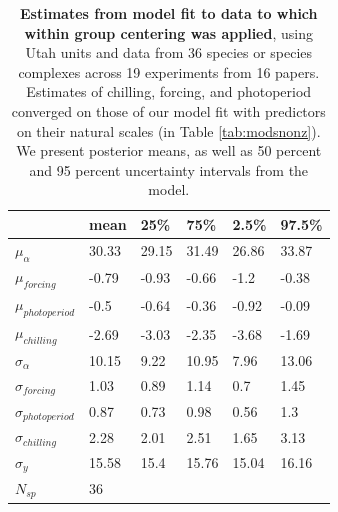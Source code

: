 \documentclass{article}
\begin{document}
\begin{footnotesize}
\begin{table}[ht]
\centering
\caption{\textbf{Estimates from model fit to data to which within group centering was applied}, using Utah units and data from 36 species or species complexes across 19 experiments from 16 papers. Estimates of chilling, forcing, and photoperiod  converged on those of our model fit with predictors on their natural scales (in Table \ref{tab:modsnonz}). We present posterior means, as well as 50 percent and 95 percent uncertainty intervals from the model.} 
\label{tab:wgc}
\begingroup\footnotesize
\begin{tabular}{|p{}|p{}p{}p{}p{}p{}|}
  \hline
 & mean & 25\% & 75\% & 2.5\% & 97.5\% \\ 
  \hline
$\mu_{\alpha}$ & 30.33 & 29.15 & 31.49 & 26.86 & 33.87 \\ 
  $\mu_{forcing}$ & -0.79 & -0.93 & -0.66 & -1.2 & -0.38 \\ 
  $\mu_{photoperiod}$ & -0.5 & -0.64 & -0.36 & -0.92 & -0.09 \\ 
  $\mu_{chilling}$ & -2.69 & -3.03 & -2.35 & -3.68 & -1.69 \\ 
  $\sigma_{\alpha}$ & 10.15 & 9.22 & 10.95 & 7.96 & 13.06 \\ 
  $\sigma_{forcing}$ & 1.03 & 0.89 & 1.14 & 0.7 & 1.45 \\ 
  $\sigma_{photoperiod}$ & 0.87 & 0.73 & 0.98 & 0.56 & 1.3 \\ 
  $\sigma_{chilling}$ & 2.28 & 2.01 & 2.51 & 1.65 & 3.13 \\ 
  $\sigma_{y}$ & 15.58 & 15.4 & 15.76 & 15.04 & 16.16 \\ 
   \hline
$N_{sp}$ & 36 &  &  &  &  \\ 
   \hline
\end{tabular}
\endgroup
\end{table}


\end{footnotesize}
\end{document}
